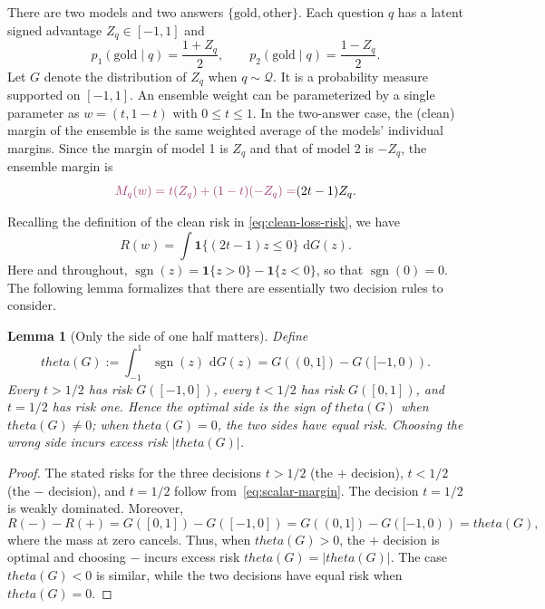 \documentclass[11pt]{article}
\def\theta{theta}%
\newtheorem{lemma}[theorem]{Lemma}
\newcommand{\one}{\mathbf 1}
\newcommand{\sgn}{\operatorname{sgn}}
\newcommand{\calQ}{\mathcal Q}
\newcommand{\dd}{\,\mathrm d}
\newcommand\aed[1]{{\color{magenta!60!black} #1}}
\begin{document}
There are two models and two answers \aed{$\{\mathrm{gold}, \mathrm{other}\}$}.  Each question $q$ has a latent signed advantage $Z_q\in[-1,1]$ and
\begin{equation}
\label{eq:antisymmetric}
p_1(\mathrm{gold}\mid q)=\frac{1+Z_q}{2},
\qquad
p_2(\mathrm{gold}\mid q)=\frac{1-Z_q}{2}.
\end{equation}
Let $G$ denote the distribution of $Z_q$ when $q\sim\calQ$.  It is a probability measure supported on $[-1,1]$.
An ensemble weight \aed{can be parameterized by a single parameter as} $w=(t,1-t)$ with $0\le t\le1$. \aed{In the two-answer case, 
the (clean) margin of the ensemble  is the same weighted average of the models' individual margins.}
\aed{Since the margin of model 1} is $Z_q$ and that of model 2 is $-Z_q$, \aed{the ensemble margin is}
\begin{equation}
\label{eq:scalar-margin}
\aed{M_q(w) = t(Z_q) + (1-t)(-Z_q)
=} (2t-1)Z_q.
\end{equation}

Recalling the definition of the clean risk in \eqref{eq:clean-loss-risk}, we have
\[
R(w)=\int\one\{(2t-1)z\le0\}\,\dd G(z).
\]
Here and throughout, $\sgn(z)=\one\{z>0\}-\one\{z<0\}$, so that $\sgn(0)=0$.  The following lemma formalizes that there are essentially two decision rules to consider.

\begin{lemma}[Only the side of one half matters]
\label{lem:side}
\aed{Define}
\begin{equation}
\label{eq:theta}
\theta(G)
:=
\int_{-1}^1\sgn(z)\,\dd G(z)
=
G((0,1])-G([-1,0)).
\end{equation}
Every $t>1/2$ has risk \aed{$G([-1,0])$}, every $t<1/2$ has risk \aed{$G([0,1])$}, and $t=1/2$ has risk one.  Hence the optimal side is the sign of $\theta(G)$ when $\theta(G)\ne0$; when $\theta(G)=0$, the two sides have equal risk.  Choosing the wrong side incurs excess risk $|\theta(G)|$.
\end{lemma}

\begin{proof}
The stated risks for the three decisions $t>1/2$ (the $+$ decision), $t<1/2$ (the $-$ decision), and $t=1/2$ follow from~\eqref{eq:scalar-margin}.  The decision $t=1/2$ is weakly dominated.  Moreover,
\[
R(-)-R(+)
=G([0,1])-G([-1,0])
=G((0,1])-G([-1,0))
=\theta(G),
\]
where the mass at zero cancels.  Thus, when $\theta(G)>0$, the $+$ decision is optimal and choosing $-$ incurs excess risk $\theta(G)=|\theta(G)|$.  The case $\theta(G)<0$ is similar, while the two decisions have equal risk when $\theta(G)=0$.

\end{proof}
\end{document}
